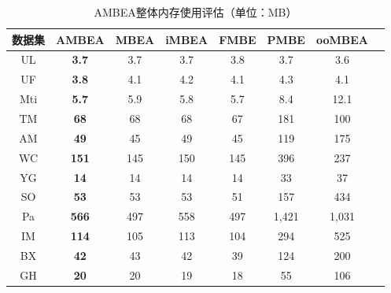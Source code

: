\begin{table} [H]
	\centering    
	\setlength{\abovecaptionskip}{0cm}  
  \setlength{\belowcaptionskip}{-0.1cm}
	\caption{AMBEA整体内存使用评估（单位：MB）}      
	\label{tbl:ambea_memory}
	\setlength{\tabcolsep}{5pt}
	\begin{center}
				\normalsize{
		\begin{tabular}{cccccccc}
			\hline 

      \textbf{数据集} & \textbf{AMBEA} & \textbf{MBEA} & \textbf{iMBEA} & \textbf{FMBE} & \textbf{PMBE} & \textbf{ooMBEA} \\ \hline
      UL & \textbf{3.7} & 3.7 & 3.7 & 3.8 & 3.7 & 3.6 \\
      UF & \textbf{3.8} & 4.1 & 4.2 & 4.1 & 4.3 & 4.1 \\
      Mti & \textbf{5.7} & 5.9 & 5.8 & 5.7 & 8.4 & 12.1 \\
      TM & \textbf{68} & 68 & 68 & 67 & 181 & 100 \\
      AM & \textbf{49} & 45 & 49 & 45 & 119 & 175 \\
      WC & \textbf{151} & 145 & 150 & 145 & 396 & 237 \\
      YG & \textbf{14} & 14 & 14 & 14 & 33 & 37 \\
      SO & \textbf{53} & 53 & 53 & 51 & 157 & 434 \\
      Pa & \textbf{566} & 497 & 558 & 497 & 1,421 & 1,031 \\
      IM & \textbf{114} & 105 & 113 & 104 & 294 & 525 \\
      BX & \textbf{42} & 43 & 42 & 39 & 124 & 200 \\
      GH & \textbf{20} & 20 & 19 & 18 & 55 & 106 \\ \hline
		\end{tabular}
				}
	\end{center}

\end{table}
